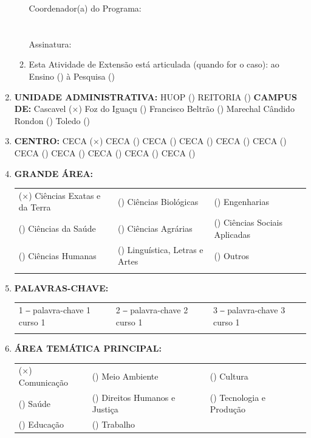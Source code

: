 \documentclass[12pt,a4paper,oneside]{article}%
\begin{document}
\begin{enumerate}
\begin{mdframed}[innertopmargin=5pt, innerleftmargin=3pt, innerrightmargin=3pt]
\begin{enumerate}
            Coordenador(a) do Programa: \\ \\ \\
            Assinatura: \hrulefill \\
\item%
Esta Atividade de Extensão está articulada (quando for o caso): ao Ensino () à Pesquisa ()%
\end{enumerate}%
\end{mdframed}%
\item%
\textbf{UNIDADE ADMINISTRATIVA: }%
HUOP () %
REITORIA () %
\newline%
\textbf{CAMPUS DE: }%
Cascavel ($\times$) %
Foz do Iguaçu () %
Francisco Beltrão () %
Marechal Cândido Rondon () %
Toledo () %
\item%
\textbf{CENTRO: }%
\newline%
CECA ($\times$) %
CECA () %
CECA () %
CECA () %
CECA () %
CECA () %
CECA () %
CECA () %
CECA () %
CECA () %
CECA () %
\item%
\textbf{GRANDE ÁREA: }%
\newline%
\begin{tabularx}{\linewidth}{|X|X|X|}%
\hline%
($\times$) Ciências Exatas e da Terra&() Ciências Biológicas&() Engenharias\\%
() Ciências da Saúde&() Ciências Agrárias&() Ciências Sociais Aplicadas\\%
() Ciências Humanas&() Linguística, Letras e Artes&() Outros\\%
&&\\%
\hline%
\end{tabularx}%
\item%
\textbf{PALAVRAS{-}CHAVE: }%
\newline%
\begin{tabularx}{\linewidth}{|X|X|X|}%
\hline%
1 ‒ palavra{-}chave 1 curso 1&2 ‒ palavra{-}chave 2 curso 1&3 ‒ palavra{-}chave 3 curso 1\\%
&&\\%
\hline%
\end{tabularx}%
\item%
\textbf{ÁREA TEMÁTICA PRINCIPAL: }%
\newline%
\begin{tabularx}{\linewidth}{|X|X|X|}%
\hline%
($\times$) Comunicação&() Meio Ambiente&() Cultura\\%
() Saúde&() Direitos Humanos e Justiça&() Tecnologia e Produção\\%
() Educação&() Trabalho&\\%

\end{tabularx}
\end{enumerate}
\end{document}
